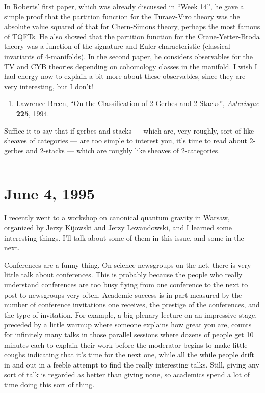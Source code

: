 \documentclass{article}
\def\tightlist{}
\begin{document}
In Roberts' first paper, which was already discussed in
\protect\hyperlink{week14}{``Week 14''}, he gave a simple proof that the
partition function for the Turaev-Viro theory was the absolute value
squared of that for Chern-Simons theory, perhaps the most famous of
TQFTs. He also showed that the partition function for the
Crane-Yetter-Broda theory was a function of the signature and Euler
characteristic (classical invariants of 4-manifolds). In the second
paper, he considers observables for the TV and CYB theories depending on
cohomology classes in the manifold. I wish I had energy now to explain a
bit more about these observables, since they are very interesting, but I
don't!

\begin{enumerate}
\def\labelenumi{\arabic{enumi})}
\setcounter{enumi}{5}
\tightlist
\item
  Lawrence Breen, ``On the Classification of 2-Gerbes and 2-Stacks'',
  \emph{Asterisque} \textbf{225}, 1994.
\end{enumerate}

Suffice it to say that if gerbes and stacks --- which are, very roughly,
sort of like sheaves of categories --- are too simple to interest you,
it's time to read about 2-gerbes and 2-stacks --- which are roughly like
sheaves of 2-categories.

\begin{center}\rule{0.5\linewidth}{0.5pt}\end{center}
\hypertarget{week55}{%
\section{June 4, 1995}\label{week55}}

I recently went to a workshop on canonical quantum gravity in Warsaw,
organized by Jerzy Kijowski and Jerzy Lewandowski, and I learned some
interesting things. I'll talk about some of them in this issue, and some
in the next.

Conferences are a funny thing. On science newsgroups on the net, there
is very little talk about conferences. This is probably because the
people who really understand conferences are too busy flying from one
conference to the next to post to newsgroups very often. Academic
success is in part measured by the number of conference invitations one
receives, the prestige of the conferences, and the type of invitation.
For example, a big plenary lecture on an impressive stage, preceded by a
little warmup where someone explains how great you are, counts for
infinitely many talks in those parallel sessions where dozens of people
get 10 minutes each to explain their work before the moderator begins to
make little coughs indicating that it's time for the next one, while all
the while people drift in and out in a feeble attempt to find the really
interesting talks. Still, giving any sort of talk is regarded as better
than giving none, so academics spend a lot of time doing this sort of
thing.
\end{document}

